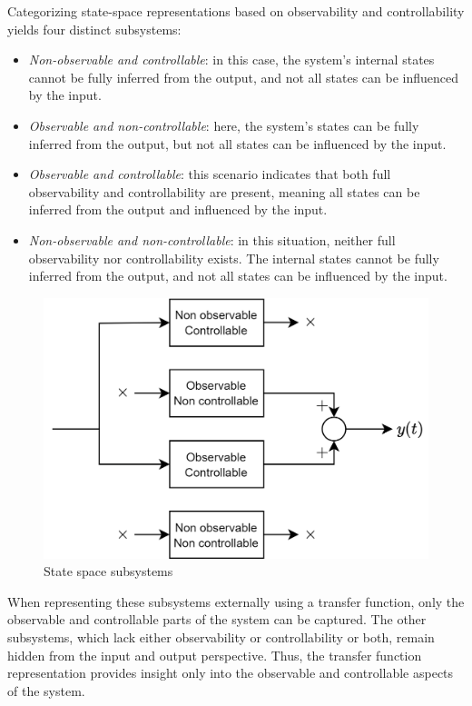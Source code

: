 Categorizing state-space representations based on observability and controllability yields four distinct subsystems:
\begin{itemize}
    \item \textit{Non-observable and controllable}: in this case, the system's internal states cannot be fully inferred from the output, and not all states can be influenced by the input.
    \item \textit{Observable and non-controllable}: here, the system's states can be fully inferred from the output, but not all states can be influenced by the input.
    \item \textit{Observable and controllable}: this scenario indicates that both full observability and controllability are present, meaning all states can be inferred from the output and influenced by the input.
    \item \textit{Non-observable and non-controllable}: in this situation, neither full observability nor controllability exists. 
        The internal states cannot be fully inferred from the output, and not all states can be influenced by the input.
\end{itemize}
\begin{figure}[H]
    \centering
    \includegraphics[width=0.5\linewidth]{images/subblock.png}
    \caption{State space subsystems}
\end{figure}
When representing these subsystems externally using a transfer function, only the observable and controllable parts of the system can be captured. 
The other subsystems, which lack either observability or controllability or both, remain hidden from the input and output perspective. 
Thus, the transfer function representation provides insight only into the observable and controllable aspects of the system.

